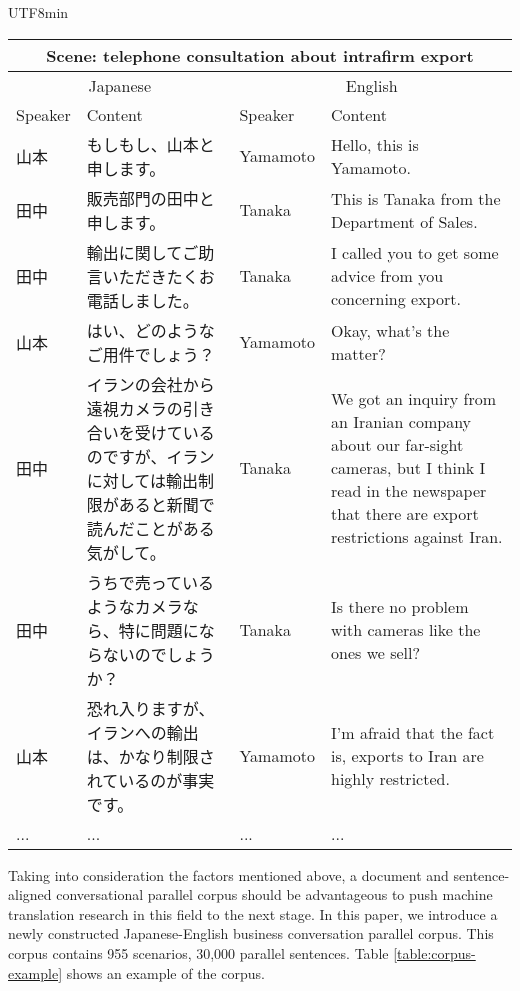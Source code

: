 \documentclass[11pt,a4paper]{article}
\begin{document}
\begin{CJK}{UTF8}{min}
\begin{table*}[t]
\centering
\begin{small}
\begin{tabular}{|@{ }l@{ }|@{ }p{6cm}@{ }|@{ }l@{ }|@{ }p{6cm}@{ }|}
 \multicolumn{4}{c}{Scene: telephone consultation about intrafirm export} \\ \hline
 \multicolumn{2}{|c|}{Japanese} & \multicolumn{2}{|c|}{English} \\ \hline 
 Speaker & Content & Speaker & Content \\ \hline
 山本 & もしもし、山本と申します。 & Yamamoto & Hello, this is Yamamoto. \\ \hline
 田中 & 販売部門の田中と申します。 & Tanaka & This is Tanaka from the Department of Sales. \\ \hline
 田中 & 輸出に関してご助言いただきたくお電話しました。 & Tanaka & I called you to get some advice from you concerning export. \\ \hline
 山本 & はい、どのようなご用件でしょう？ & Yamamoto & Okay, what's the matter? \\ \hline
 田中 & イランの会社から遠視カメラの引き合いを受けているのですが、イランに対しては輸出制限があると新聞で読んだことがある気がして。 & Tanaka & We got an inquiry from an Iranian company about our far-sight cameras, but I think I read in the newspaper that there are export restrictions against Iran. \\ \hline
 田中 & うちで売っているようなカメラなら、特に問題にならないのでしょうか？ & Tanaka & Is there no problem with cameras like the ones we sell? \\ \hline
 山本 & 恐れ入りますが、イランへの輸出は、かなり制限されているのが事実です。 & Yamamoto & I'm afraid that the fact is, exports to Iran are highly restricted. \\ \hline
 ... & ... & ... & ... \\ \hline
\end{tabular}
\end{small}
\caption{An example of the Japanese-English business conversation parallel corpus.}
\label{table:corpus-example}
\end{table*}
\end{CJK}

Taking into consideration the factors mentioned above, a document and sentence-aligned conversational parallel corpus should be advantageous to push machine translation research in this field to the next stage. In this paper, we introduce a newly constructed Japanese-English business conversation parallel corpus. This corpus contains 955 scenarios, 30,000 parallel sentences. Table \ref{table:corpus-example} shows an example of the corpus. 
\end{document}
